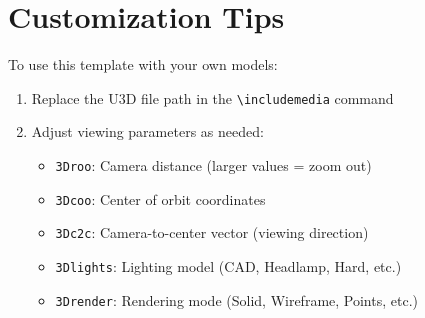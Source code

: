\documentclass{article}
\begin{document}
\section*{Customization Tips}
To use this template with your own models:
\begin{enumerate}
    \item Replace the U3D file path in the \verb|\includemedia| command
    \item Adjust viewing parameters as needed:
    \begin{itemize}
        \item \verb|3Droo|: Camera distance (larger values = zoom out)
        \item \verb|3Dcoo|: Center of orbit coordinates
        \item \verb|3Dc2c|: Camera-to-center vector (viewing direction)
        \item \verb|3Dlights|: Lighting model (CAD, Headlamp, Hard, etc.)
        \item \verb|3Drender|: Rendering mode (Solid, Wireframe, Points, etc.)
    \end{itemize}
\end{enumerate}
\end{document}
